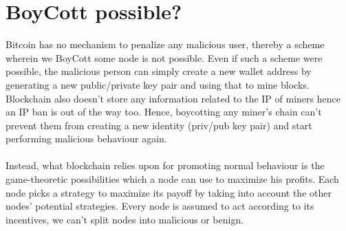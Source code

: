 \section{BoyCott possible?}

Bitcoin has no mechanism to penalize any malicious user, thereby a scheme wherein we BoyCott some node is not possible. Even if such a scheme were possible, the malicious person can simply create a new wallet address by generating a new public/private key pair and using that to mine blocks.
Blockchain also doesn't store any information related to the IP of miners hence an IP ban is out of the way too. Hence, boycotting any miner's chain can't prevent them from creating a new identity (priv/pub key pair) and start performing malicious behaviour again. \\ \\ 
Instead, what blockchain relies upon for promoting normal behaviour is the game-theoretic possibilities which a node can use to maximize his profits. Each node picks a strategy  to maximize its payoff by taking into account the other nodes' potential strategies. Every node is assumed to act according to its incentives, we can't split nodes into malicious or benign.

